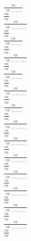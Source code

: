 \documentclass[11pt]{article}
\begin{document}
\begin{center}
\\$\frac{\Rightarrow }{\Rightarrow , , , , , }$
\bigskip
\\$\frac{\Rightarrow }{\Rightarrow }$
\bigskip
\\$\frac{\Rightarrow }{\Rightarrow , , , , , , , }$
\bigskip
\\$\frac{\Rightarrow }{\Rightarrow }$
\bigskip
\\$\frac{\Rightarrow }{\Rightarrow , , , , , }$
\bigskip
\\$\frac{\Rightarrow }{\Rightarrow }$
\bigskip
\\$\frac{\Rightarrow }{\Rightarrow , , , , , , , }$
\bigskip
\\$\frac{\Rightarrow }{\Rightarrow }$
\bigskip
\\$\frac{\Rightarrow }{\Rightarrow , , , , , }$
\bigskip
\\$\frac{\Rightarrow }{\Rightarrow }$
\bigskip
\\$\frac{\Rightarrow }{\Rightarrow , , , , , , , }$
\bigskip
\\$\frac{\Rightarrow }{\Rightarrow }$
\bigskip
\\$\frac{\Rightarrow }{\Rightarrow , , , , , }$
\bigskip
\\$\frac{\Rightarrow }{\Rightarrow }$
\bigskip
\\$\frac{\Rightarrow }{\Rightarrow , , , , , , , }$
\bigskip
\\$\frac{\Rightarrow }{\Rightarrow }$
\bigskip
\\$\frac{\Rightarrow }{\Rightarrow , , , , , , , }$
\bigskip
\\$\frac{\Rightarrow }{\Rightarrow }$
\bigskip
\\$\frac{\Rightarrow }{\Rightarrow , , , , , , , }$
\bigskip
\\$\frac{\Rightarrow }{\Rightarrow }$
\bigskip
\\$\frac{\Rightarrow }{\Rightarrow , , , , , , , }$
\bigskip
\\$\frac{\Rightarrow }{\Rightarrow }$
\bigskip
\\$\frac{\Rightarrow }{\Rightarrow , , , , , , , }$
\bigskip
\\$\frac{\Rightarrow }{\Rightarrow }$
\bigskip
\\$\frac{\Rightarrow }{\Rightarrow , , , , , , , }$
\bigskip
\\$\frac{\Rightarrow }{\Rightarrow }$
\bigskip
\\$\frac{\Rightarrow }{\Rightarrow , , , , , , , }$
\bigskip
\\$\frac{\Rightarrow }{\Rightarrow }$

\end{center}
\end{document}

